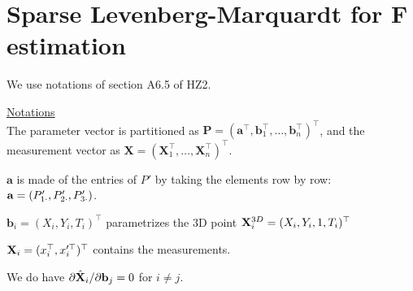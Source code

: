 \section{Sparse Levenberg-Marquardt for F estimation}
We use notations of section A6.5 of HZ2.

\underline{Notations}\\
The parameter vector is partitioned as $\mathbf{P}=(\mathbf{a}^\top,\mathbf{b}_1^\top, \ldots, \mathbf{b}_n^\top)^\top$, and the measurement vector as $\mathbf{X}=(\mathbf{X}_1^\top, \ldots, \mathbf{X}_n^\top)^\top$.

$\mathbf{a}$ is made of the entries of $P'$ by taking the elements row by row: $\mathbf{a}=({P'_{1 \cdot}},{P'_{2 \cdot}},{P'_{3 \cdot}})$.

$\mathbf{b}_i=(X_i,Y_i,T_i)^\top$ parametrizes the 3D point ${\mathbf{X}^{3D}_i}=(X_i,Y_i,1,T_i)^\top$

$\mathbf{X}_i=(x_i^\top,x_i'^\top)^\top$ contains the measurements.

We do have $\partial \hat{\mathbf{X}}_i / \partial \mathbf{b}_j=0$ for $i \neq j$.

